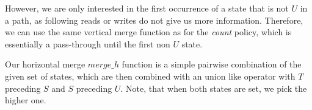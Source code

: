 However, we are only interested in the first occurrence of a state that is not $U$ in a path, as following reads or writes do not give us more information. Therefore, we can use 
the same vertical merge function as for the \emph{count} policy, which is essentially a pass-through until the first non $U$ state.

Our horizontal merge $merge\_h$ function is a simple pairwise combination of the given set of states, which are then combined with an union like operator with $T$ 
preceding $S$ and $S$ preceding $U$. Note, that when both states are set, we pick the higher one.

%
%
%
